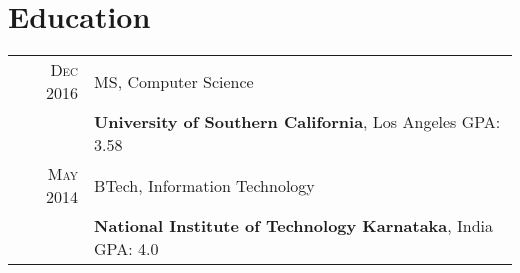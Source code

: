 \section{Education}
\begin{tabular}{rl}

\textsc{Dec 2016} & MS, Computer Science\\
&\textbf{University of Southern California}, Los Angeles\hspace{2.8cm} GPA: 3.58
\\
\textsc{May} 2014 & BTech, Information Technology\\
&\textbf{National Institute of Technology Karnataka}, India\hspace{2cm} GPA: 4.0

\end{tabular}
\vspace{5pt}
